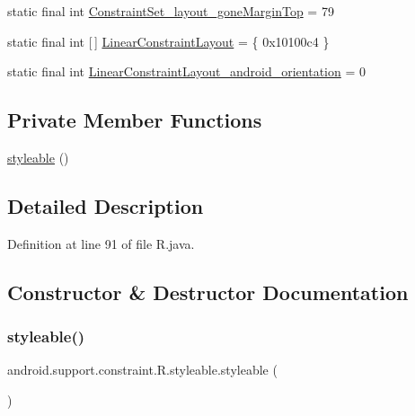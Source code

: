 \begin{DoxyCompactItemize}
\item 
static final int \mbox{\hyperlink{classandroid_1_1support_1_1constraint_1_1_r_1_1styleable_a48d4e9fa9a5f65b77b9ac76e11cde077}{Constraint\+Set\+\_\+layout\+\_\+gone\+Margin\+Top}} = 79
\item 
static final int \mbox{[}$\,$\mbox{]} \mbox{\hyperlink{classandroid_1_1support_1_1constraint_1_1_r_1_1styleable_a3d1d810f2c6279b4ff255b6cd87b7b52}{Linear\+Constraint\+Layout}} = \{ 0x10100c4 \}
\item 
static final int \mbox{\hyperlink{classandroid_1_1support_1_1constraint_1_1_r_1_1styleable_ab75931ca103e38ee68ee432610b0520c}{Linear\+Constraint\+Layout\+\_\+android\+\_\+orientation}} = 0
\end{DoxyCompactItemize}
\subsection*{Private Member Functions}
\begin{DoxyCompactItemize}
\item 
\mbox{\hyperlink{classandroid_1_1support_1_1constraint_1_1_r_1_1styleable_a5110476dee67c0451ac38134695ba1f0}{styleable}} ()
\end{DoxyCompactItemize}


\subsection{Detailed Description}


Definition at line 91 of file R.\+java.



\subsection{Constructor \& Destructor Documentation}
\mbox{\label{classandroid_1_1support_1_1constraint_1_1_r_1_1styleable_a5110476dee67c0451ac38134695ba1f0}} 
\subsubsection{\texorpdfstring{styleable()}{styleable()}}
{\footnotesize\ttfamily android.\+support.\+constraint.\+R.\+styleable.\+styleable (\begin{DoxyParamCaption}{ }\end{DoxyParamCaption})\hspace{0.3cm}{\ttfamily [private]}}



